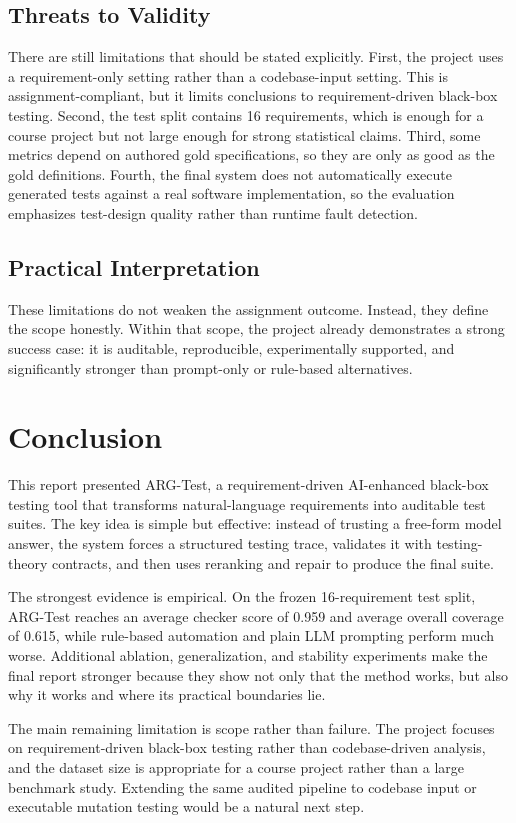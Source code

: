 \documentclass{article}
\begin{document}
\subsection{Threats to Validity}
There are still limitations that should be stated explicitly. First, the project uses a requirement-only setting rather than a codebase-input setting. This is assignment-compliant, but it limits conclusions to requirement-driven black-box testing. Second, the test split contains 16 requirements, which is enough for a course project but not large enough for strong statistical claims. Third, some metrics depend on authored gold specifications, so they are only as good as the gold definitions. Fourth, the final system does not automatically execute generated tests against a real software implementation, so the evaluation emphasizes test-design quality rather than runtime fault detection.

\subsection{Practical Interpretation}
These limitations do not weaken the assignment outcome. Instead, they define the scope honestly. Within that scope, the project already demonstrates a strong success case: it is auditable, reproducible, experimentally supported, and significantly stronger than prompt-only or rule-based alternatives.

\section{Conclusion}
This report presented ARG-Test, a requirement-driven AI-enhanced black-box testing tool that transforms natural-language requirements into auditable test suites. The key idea is simple but effective: instead of trusting a free-form model answer, the system forces a structured testing trace, validates it with testing-theory contracts, and then uses reranking and repair to produce the final suite.

The strongest evidence is empirical. On the frozen 16-requirement test split, ARG-Test reaches an average checker score of 0.959 and average overall coverage of 0.615, while rule-based automation and plain LLM prompting perform much worse. Additional ablation, generalization, and stability experiments make the final report stronger because they show not only that the method works, but also why it works and where its practical boundaries lie.

The main remaining limitation is scope rather than failure. The project focuses on requirement-driven black-box testing rather than codebase-driven analysis, and the dataset size is appropriate for a course project rather than a large benchmark study. Extending the same audited pipeline to codebase input or executable mutation testing would be a natural next step.
\end{document}
